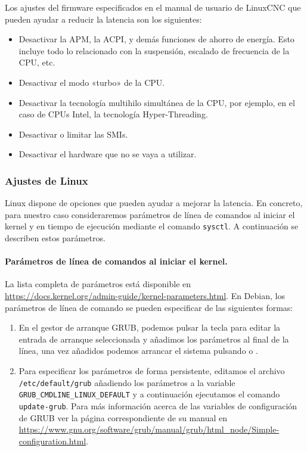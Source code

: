 \documentclass[english,spanish,a4paper,11pt]{article}
\begin{document}
Los ajustes del firmware especificados en el manual de usuario de LinuxCNC \cite{linuxcncdoc} que pueden ayudar a reducir la latencia son los siguientes:
%
\begin{itemize}
    \item Desactivar la \ac{APM}, la \ac{ACPI}, y demás funciones de ahorro de energía. Esto incluye todo lo relacionado con la suspensión, escalado de frecuencia de la \ac{CPU}, etc.
    
    \item Desactivar el modo «turbo» de la \ac{CPU}.
    
    \item Desactivar la tecnología multihilo simultánea de la \ac{CPU}, por ejemplo, en el caso de \acp{CPU} Intel, la tecnología Hyper-Threading.
    
    \item Desactivar o limitar las \acp{SMI}.
    
    \item Desactivar el hardware que no se vaya a utilizar.
\end{itemize}


\subsubsection{Ajustes de Linux}

Linux dispone de opciones que pueden ayudar a mejorar la latencia. En concreto, para nuestro caso consideraremos parámetros de línea de comandos al iniciar el kernel y en tiempo de ejecución mediante el comando \texttt{sysctl}. A continuación se describen estos parámetros.


\paragraph{Parámetros de línea de comandos al iniciar el kernel.}\hfill\medskip

La lista completa de parámetros está disponible en \url{https://docs.kernel.org/admin-guide/kernel-parameters.html}. En Debian, los parámetros de línea de comando se pueden especificar de las siguientes formas:
\begin{enumerate}
    \item En el gestor de arranque GRUB, podemos pulsar la tecla  para editar la entrada de arranque seleccionada y añadimos los parámetros al final de la línea, una vez añadidos podemos arrancar el sistema pulsando  o .
    
    \item Para especificar los parámetros de forma persistente, editamos el archivo \texttt{/etc/default/grub} añadiendo los parámetros a la variable \texttt{GRUB\_CMDLINE\_LINUX\_DEFAULT} y a continuación ejecutamos el comando \texttt{update-grub}. Para más información acerca de las variables de configuración de GRUB ver la página correspondiente de su manual en \url{https://www.gnu.org/software/grub/manual/grub/html_node/Simple-configuration.html}.
\end{enumerate}
    
\end{document}
